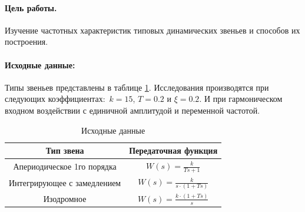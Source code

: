 \documentclass[a4paper,12pt]{article}
\renewcommand{\arraystretch}{1.5}
\begin{document}
	
	\paragraph{Цель работы.} 	Изучение частотных характеристик типовых динамических звеньев и способов их построения. 
	\paragraph {Исходные данные:} Типы звеньев представлены в таблице \ref{t_1}. Исследования производятся при следующих коэффициентах:~$k=15$, $T=0.2$ и $\xi=0.2$.  И при гармоническом входном воздействии с единичной амплитудой и переменной частотой.
	\begin{table}[h]
		\centering
		\caption{Исходные данные}
		\renewcommand{\arraystretch}{2} 
		\renewcommand{\tabcolsep}{1.6cm}
		\begin{threeparttable}
		
		
			\begin{tabular}{|c|c|}
				
				\hline
				Тип звена & Передаточная функция \\ \hline
				Апериодическое 1го порядка & $\displaystyle W(s)=\frac{k}{Ts+1}$ \\ \hline
				Интегрирующее с замедлением & $\displaystyle W(s)=\frac{k}{s\cdot (1+Ts)}$ \\ \hline
				Изодромное & $\displaystyle W(s)=\frac{k\cdot (1+Ts)}{s}$ \\ \hline
			
		\end{tabular}
		\end{threeparttable}
		\label{t_1}
	\end{table}
	
\end{document}
